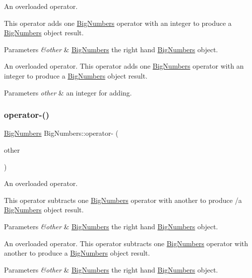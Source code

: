 An overloaded operator. 

This operator adds one \mbox{\hyperlink{class_big_numbers}{Big\+Numbers}} operator with an integer to produce a \mbox{\hyperlink{class_big_numbers}{Big\+Numbers}} object result. 
\begin{DoxyParams}{Parameters}
{\em \&other} & \mbox{\hyperlink{class_big_numbers}{Big\+Numbers}} the right hand \mbox{\hyperlink{class_big_numbers}{Big\+Numbers}} object.\\
\hline
\end{DoxyParams}
An overloaded operator. This operator adds one \mbox{\hyperlink{class_big_numbers}{Big\+Numbers}} operator with an integer to produce a \mbox{\hyperlink{class_big_numbers}{Big\+Numbers}} object result. 
\begin{DoxyParams}{Parameters}
{\em other} & an integer for adding. \\
\hline
\end{DoxyParams}
\mbox{\label{class_big_numbers_a497890bdf8b229213c617574c0cf2146}} 
\subsubsection{\texorpdfstring{operator-\/()}{operator-()}\hspace{0.1cm}{\footnotesize\ttfamily [1/2]}}
{\footnotesize\ttfamily \mbox{\hyperlink{class_big_numbers}{Big\+Numbers}} Big\+Numbers\+::operator-\/ (\begin{DoxyParamCaption}\item[{\mbox{\hyperlink{class_big_numbers}{Big\+Numbers}} \&}]{other }\end{DoxyParamCaption})}



An overloaded operator. 

This operator subtracts one \mbox{\hyperlink{class_big_numbers}{Big\+Numbers}} operator with another to produce /a \mbox{\hyperlink{class_big_numbers}{Big\+Numbers}} object result. 
\begin{DoxyParams}{Parameters}
{\em \&other} & \mbox{\hyperlink{class_big_numbers}{Big\+Numbers}} the right hand \mbox{\hyperlink{class_big_numbers}{Big\+Numbers}} object.\\
\hline
\end{DoxyParams}
An overloaded operator. This operator subtracts one \mbox{\hyperlink{class_big_numbers}{Big\+Numbers}} operator with another to produce a \mbox{\hyperlink{class_big_numbers}{Big\+Numbers}} object result. 
\begin{DoxyParams}{Parameters}
{\em \&other} & \mbox{\hyperlink{class_big_numbers}{Big\+Numbers}} the right hand \mbox{\hyperlink{class_big_numbers}{Big\+Numbers}} object. \\
\hline
\end{DoxyParams}
\mbox{\label{class_big_numbers_a1905c23eddbec66217222f7d16bde5fd}} 
